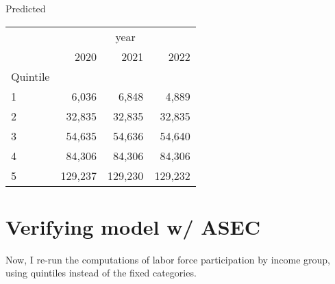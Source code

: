 \documentclass{article}
\begin{document}
		\begin{minipage}[b]{.40\textwidth}
		\centering
		Predicted	
	\begin{tabular}{llll}
		\cline{1-4}
		\multicolumn{1}{c}{} &
		\multicolumn{3}{|c}{year} \\
		\multicolumn{1}{c}{} &
		\multicolumn{1}{|r}{2020} &
		\multicolumn{1}{r}{2021} &
		\multicolumn{1}{r}{2022} \\
		\cline{1-4}
		\multicolumn{1}{l}{Quintile} &
		\multicolumn{1}{|r}{} &
		\multicolumn{1}{r}{} &
		\multicolumn{1}{r}{} \\
		\multicolumn{1}{l}{\hspace{1em}1} &
		\multicolumn{1}{|r}{6,036} &
		\multicolumn{1}{r}{6,848} &
		\multicolumn{1}{r}{4,889} \\
		\multicolumn{1}{l}{\hspace{1em}2} &
		\multicolumn{1}{|r}{32,835} &
		\multicolumn{1}{r}{32,835} &
		\multicolumn{1}{r}{32,835} \\
		\multicolumn{1}{l}{\hspace{1em}3} &
		\multicolumn{1}{|r}{54,635} &
		\multicolumn{1}{r}{54,636} &
		\multicolumn{1}{r}{54,640} \\
		\multicolumn{1}{l}{\hspace{1em}4} &
		\multicolumn{1}{|r}{84,306} &
		\multicolumn{1}{r}{84,306} &
		\multicolumn{1}{r}{84,306} \\
		\multicolumn{1}{l}{\hspace{1em}5} &
		\multicolumn{1}{|r}{129,237} &
		\multicolumn{1}{r}{129,230} &
		\multicolumn{1}{r}{129,232} \\
		\cline{1-4}
	\end{tabular}
	\end{minipage}


	\section{Verifying model w/ ASEC}
	
	Now, I re-run the computations of labor force participation by income group, using quintiles instead of the fixed categories.         
\end{document}
